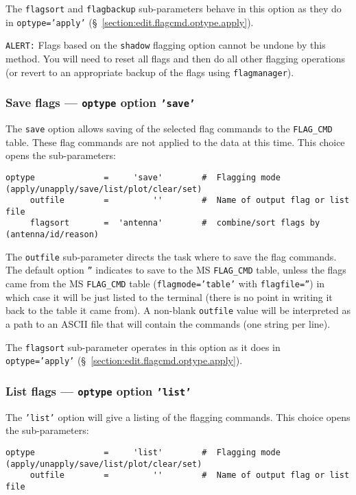 The {\tt flagsort} and {\tt flagbackup} sub-parameters behave in this
option as they do in {\tt optype='apply'} 
(\S~\ref{section:edit.flagcmd.optype.apply}).

{\tt ALERT:} Flags based on the {\tt shadow} flagging option cannot be
undone by this method.  You will need to reset all flags and then do
all other flagging operations (or revert to an appropriate backup of
the flags using {\tt flagmanager}).

\subsubsection{Save flags --- {\tt optype} option {\tt 'save'}}
\label{section:edit.flagcmd.optype.save}

The {\tt save} option allows saving of the selected flag commands to
the {\tt FLAG\_CMD} table.  These flag commands are not applied to the
data at this time.
This choice opens the sub-parameters:
\small
\begin{verbatim}
optype              =     'save'        #  Flagging mode (apply/unapply/save/list/plot/clear/set)
     outfile        =         ''        #  Name of output flag or list file
     flagsort       =  'antenna'        #  combine/sort flags by (antenna/id/reason)
\end{verbatim}
\normalsize

The {\tt outfile} sub-parameter directs the task where to save the
flag commands.  The default option {\tt ''} indicates to save to 
the MS {\tt FLAG\_CMD} table, unless the flags came from the MS
{\tt FLAG\_CMD} table ({\tt flagmode='table'} with {\tt flagfile=''})
in which case it will be just listed to the terminal (there is no
point in writing it back to the table it came from).
A non-blank {\tt outfile} value will be interpreted
as a path to an ASCII file that will contain the commands (one string
per line).

The {\tt flagsort} sub-parameter operates in this option as it does in
{\tt optype='apply'} (\S~\ref{section:edit.flagcmd.optype.apply}).

\subsubsection{List flags --- {\tt optype} option {\tt 'list'}}
\label{section:edit.flagcmd.optype.list}

The {\tt 'list'} option will give a listing of the flagging commands.
This choice opens the sub-parameters:
\small
\begin{verbatim}
optype              =     'list'        #  Flagging mode (apply/unapply/save/list/plot/clear/set)
     outfile        =         ''        #  Name of output flag or list file
\end{verbatim}
\normalsize

